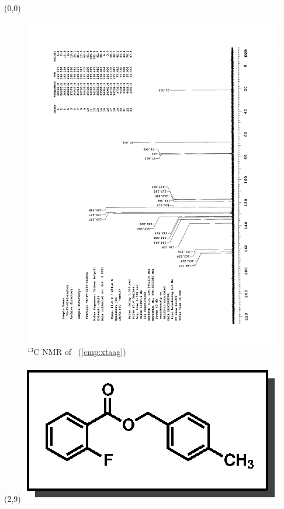 \clearpage
\begin{textblock}{20}(0,0)
\begin{figure}[htb]
\caption{$^{13}$C NMR of  \CMPxtaag\ (\ref{cmp:xtaag})}
\includegraphics[scale=0.75, trim = 0mm 0mm 0mm 5mm,
clip]{chp_asymmetric/images/nmr/xtaagC}
\vspace{-100pt}
\end{figure}
\end{textblock}
\begin{textblock}{1}(2,9)
\includegraphics[scale=0.8, angle=90]{chp_asymmetric/images/xtaag}
\end{textblock}

